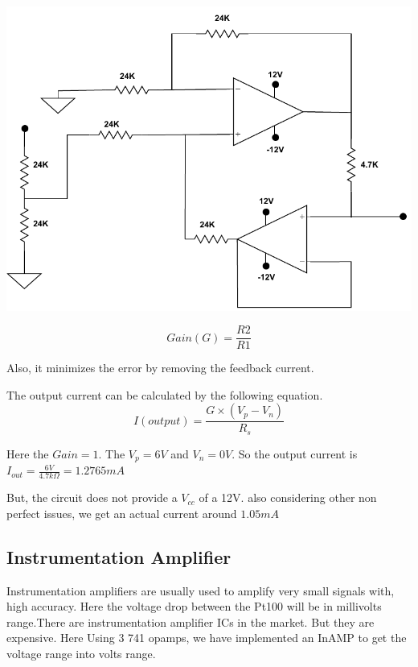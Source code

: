 \begin{multicols}{2}
\begin{minipage}{0.45\textwidth}
\centering
\includegraphics[width=\textwidth]{Method/Constant current.pdf}
\end{minipage}

$$Gain (G) = \frac{R2}{R1}$$

Also, it minimizes the error by removing the feedback current.

The output current can be calculated by the following equation.
$$I(output)=\frac{G \times (V_p - V_n)}{R_s}$$

Here the $Gain=1$. The $V_p =6V $ and $V_n =0V $. So the output current is\\ $I_{out}=\frac{6V}{4.7k\Omega}=1.2765mA$

But, the circuit does not provide a $V_{cc}$ of a 12V. also considering other non perfect issues, we get an actual current around $1.05mA$

\subsection{Instrumentation Amplifier}
Instrumentation amplifiers are usually used to amplify very small signals with, high accuracy. Here the voltage drop between the Pt100 will be in millivolts range.There are instrumentation amplifier ICs in the market. But they are expensive. Here Using 3 741 opamps, we have implemented an InAMP to get the voltage range into volts range.


\end{multicols}
